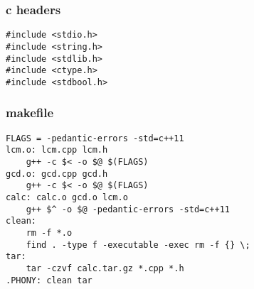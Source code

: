\documentclass[10pt]{article}
\begin{document}
\begin{multicols*}{2}
    \subsubsection*{c headers}
    \begin{tcolorbox}[halign=left]
        \begin{verbatim}
#include <stdio.h>
#include <string.h>
#include <stdlib.h>
#include <ctype.h>
#include <stdbool.h>
        \end{verbatim}
    \end{tcolorbox}

    \subsubsection*{makefile}
    \begin{tcolorbox}[halign=left]
        \begin{verbatim}
FLAGS = -pedantic-errors -std=c++11
lcm.o: lcm.cpp lcm.h
    g++ -c $< -o $@ $(FLAGS)
gcd.o: gcd.cpp gcd.h
    g++ -c $< -o $@ $(FLAGS)
calc: calc.o gcd.o lcm.o
    g++ $^ -o $@ -pedantic-errors -std=c++11
clean:
    rm -f *.o
    find . -type f -executable -exec rm -f {} \;
tar:
    tar -czvf calc.tar.gz *.cpp *.h
.PHONY: clean tar
        \end{verbatim}
    \end{tcolorbox}

\end{multicols*}
\end{document}
